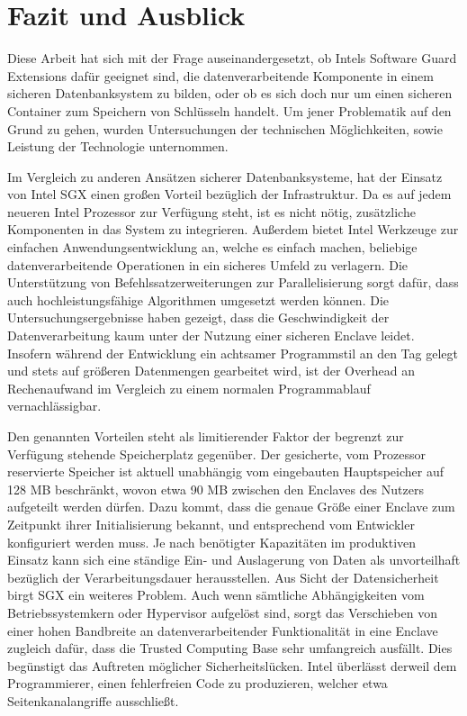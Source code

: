 
\chapter{Fazit und Ausblick}

Diese Arbeit hat sich mit der Frage auseinandergesetzt, ob Intels Software Guard Extensions dafür geeignet sind, die datenverarbeitende Komponente in einem sicheren Datenbanksystem zu bilden, oder ob es sich doch nur um einen sicheren Container zum Speichern von Schlüsseln handelt. Um jener Problematik auf den Grund zu gehen, wurden Untersuchungen der technischen Möglichkeiten, sowie Leistung der Technologie unternommen.

Im Vergleich zu anderen Ansätzen sicherer Datenbanksysteme, hat der Einsatz von Intel \ac{SGX} einen großen Vorteil bezüglich der Infrastruktur. Da es auf jedem neueren Intel Prozessor zur Verfügung steht, ist es nicht nötig, zusätzliche Komponenten in das System zu integrieren. Außerdem bietet Intel Werkzeuge zur einfachen Anwendungsentwicklung an, welche es einfach machen, beliebige datenverarbeitende Operationen in ein sicheres Umfeld zu verlagern. Die Unterstützung von Befehlssatzerweiterungen zur Parallelisierung sorgt dafür, dass auch hochleistungsfähige Algorithmen umgesetzt werden können. Die Untersuchungsergebnisse haben gezeigt, dass die Geschwindigkeit der Datenverarbeitung kaum unter der Nutzung einer sicheren Enclave leidet. Insofern während der Entwicklung ein achtsamer Programmstil an den Tag gelegt und stets auf größeren Datenmengen gearbeitet wird, ist der Overhead an Rechenaufwand im Vergleich zu einem normalen Programmablauf vernachlässigbar.

Den genannten Vorteilen steht als limitierender Faktor der begrenzt zur Verfügung stehende Speicherplatz gegenüber. Der gesicherte, vom Prozessor reservierte Speicher ist aktuell unabhängig vom eingebauten Hauptspeicher auf 128 MB beschränkt, wovon etwa 90 MB zwischen den Enclaves des Nutzers aufgeteilt werden dürfen. Dazu kommt, dass die genaue Größe einer Enclave zum Zeitpunkt ihrer Initialisierung bekannt, und entsprechend vom Entwickler konfiguriert werden muss. Je nach benötigter Kapazitäten im produktiven Einsatz kann sich eine ständige Ein- und Auslagerung von Daten als unvorteilhaft bezüglich der Verarbeitungsdauer herausstellen. Aus Sicht der Datensicherheit birgt \ac{SGX} ein weiteres Problem. Auch wenn sämtliche Abhängigkeiten vom Betriebssystemkern oder Hypervisor aufgelöst sind, sorgt das Verschieben von einer hohen Bandbreite an datenverarbeitender Funktionalität in eine Enclave zugleich dafür, dass die Trusted Computing Base sehr umfangreich ausfällt. Dies begünstigt das Auftreten möglicher Sicherheitslücken. Intel überlässt derweil dem Programmierer, einen fehlerfreien Code zu produzieren, welcher etwa Seitenkanalangriffe ausschließt.

